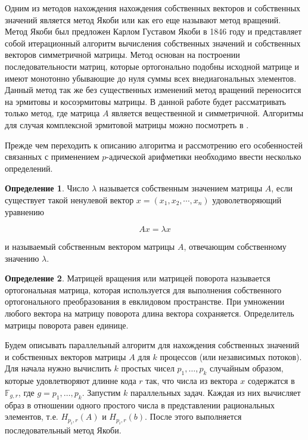 \documentclass[master, och, diploma, times]{sty/SCWorks}
\theoremstyle{plain}
\theoremstyle{definition}
\newtheorem{defn}{Определение}[section]
\begin{document}
Одним из методов нахождения нахождения собственных векторов и собственных значений является метод Якоби или как его еще называют метод вращений. Метод Якоби был предложен Карлом Густавом Якоби в 1846 году и представляет собой итерационный алгоритм вычисления собственных значений и собственных векторов симметричной матрицы. Метод основан на построении последовательности матриц, которые ортогонально подобны исходной матрице и имеют монотонно убывающие до нуля суммы всех внедиагональных элементов. Данный метод так же без существенных изменений метод вращений переносится на эрмитовы и косоэрмитовы матрицы. В данной работе будет рассматривать только метод, где матрица $A$ является вещественной и симметричной. Алгоритмы для случая комплексной эрмитовой матрицы можно посмотреть в \cite{bib:numbers:voevodin}.

Прежде чем переходить к описанию алгоритма и рассмотрению его особенностей связанных с применением $p$-адической арифметики необходимо ввести несколько определений.


\begin{defn}
Число $\lambda$ называется собственным значением матрицы $A$, если существует такой ненулевой вектор $x=(x_1,x_2,\cdots,x_n)$ удоволетворяющий уравнению

\begin{equation}
Ax=\lambda x
\end{equation}
	
\noindent и называемый собственным вектором матрицы $A$, отвечающим собственному значению $\lambda$.
\end{defn}


\begin{defn}
Матрицей вращения или матрицей поворота называется ортогональная матрица, которая используется для выполнения собственного ортогонального преобразования в евклидовом пространстве. При умножении любого вектора на матрицу поворота длина вектора сохраняется. Определитель матрицы поворота равен единице.
\end{defn}

Будем описывать параллельный алгоритм для нахождения собственных значений и собственных векторов матрицы $A$ для $k$ процессов (или независимых потоков). Для начала нужно вычислить $k$ простых чисел $p_1, \dots, p_k$ случайным образом, которые удовлетворяют длинне кода $r$ так, что числа из вектора $x$ содержатся в $\mathbb{F}_{g,r}$, где $g=p_1,\dots,p_k$. 
Запустим $k$ параллельных задач. Каждая из них вычисляет образ в отношении одного простого числа в представлении рациональных элементов, т.е. $H_{p_i,r}(A)$ и $H_{p_i,r}(b)$. После этого выполняется последовательный метод Якоби.
\end{document}
